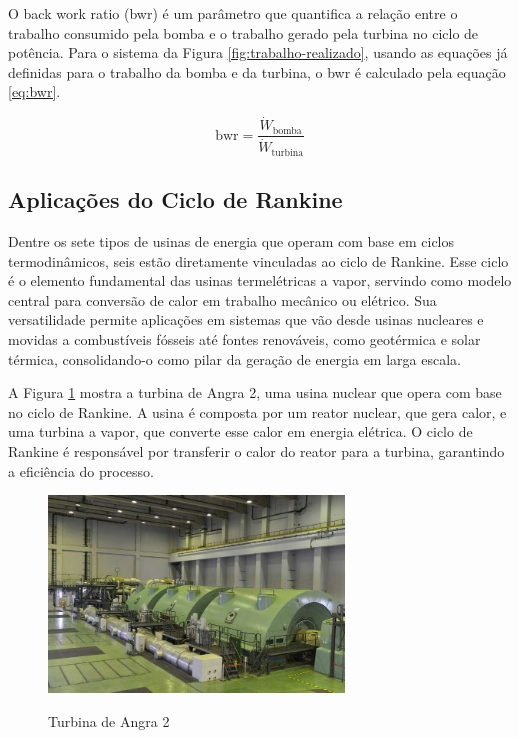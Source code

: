 \documentclass[
	article,			%
	11pt,				%
	oneside,			%
	a4paper,			%
	english,			%
	brazil,				%
	sumario=tradicional
	]{abntex2}
\begin{document}
O back work ratio (bwr) é um parâmetro que quantifica a relação entre o trabalho consumido pela bomba e o trabalho gerado pela turbina no ciclo de potência. Para o sistema da Figura \ref{fig:trabalho-realizado}, usando as equações já definidas para o trabalho da bomba e da turbina, o bwr é calculado pela equação \ref{eq:bwr}.

\begin{equation}
	\text{bwr} = \frac{\dot{W}_{\text{bomba}}}{\dot{W}_{\text{turbina}}}
	\label{eq:bwr}
\end{equation}

\subsection{Aplicações do Ciclo de Rankine}

Dentre os sete tipos de usinas de energia que operam com base em ciclos termodinâmicos, seis estão diretamente vinculadas ao ciclo de Rankine. Esse ciclo é o elemento fundamental das usinas termelétricas a vapor, servindo como modelo central para conversão de calor em trabalho mecânico ou elétrico. Sua versatilidade permite aplicações em sistemas que vão desde usinas nucleares e movidas a combustíveis fósseis até fontes renováveis, como geotérmica e solar térmica, consolidando-o como pilar da geração de energia em larga escala.

A Figura \ref{fig:etn} mostra a turbina de Angra 2, uma usina nuclear que opera com base no ciclo de Rankine. A usina é composta por um reator nuclear, que gera calor, e uma turbina a vapor, que converte esse calor em energia elétrica. O ciclo de Rankine é responsável por transferir o calor do reator para a turbina, garantindo a eficiência do processo.

\begin{figure}[h]
	\centering
	\caption{Turbina de Angra 2}
	\includegraphics[width=0.7\textwidth]{./images/etn.jpg}
	\label{fig:etn}
\end{figure}
\end{document}
